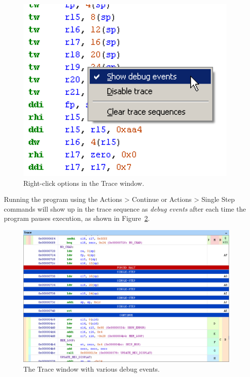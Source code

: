 \documentclass[11pt, twoside, pdftex]{article}
\begin{document}
\begin{figure}[H]
   \begin{center}
      \includegraphics[scale=0.5]{screenshots/figure49.png}
   \end{center}
   \caption{Right-click options in the Trace window.}
	 \label{fig:49}
\end{figure}

Running the program using the \textsf{Actions > Continue} or
\textsf{Actions > Single Step} commands will show up in the
trace sequence as {\it debug events} after each time the
program pauses execution, as shown in 
Figure~\ref{fig:50}.

\begin{figure}[H]
   \begin{center}
      \includegraphics[scale=0.5]{screenshots/figure50.png}
   \end{center}
   \caption{The Trace window with various debug events.}
	 \label{fig:50}
\end{figure}
\end{document}
